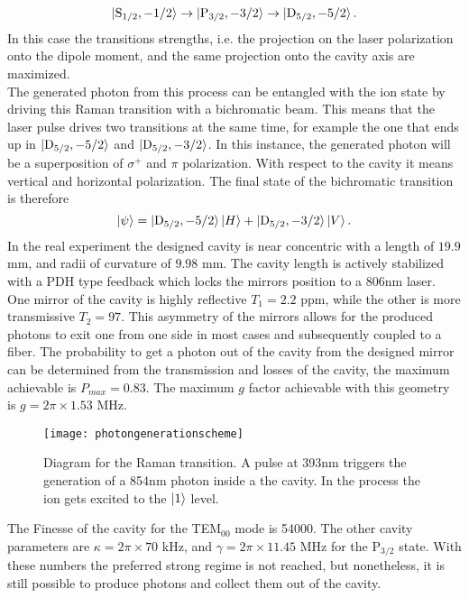 \begin{equation}
\ket{\text{S}_{1/2},-1/2}\to\ket{\text{P}_{3/2},-3/2} \to \ket{\text{D}_{5/2},-5/2}.
\end{equation}
In this case the transitions strengths, i.e. the projection on the laser polarization onto the dipole moment, and the same projection onto the cavity axis are maximized.\\
The generated photon from this process can be entangled with the ion state by driving this Raman transition with a bichromatic beam. This means that the laser pulse drives two transitions at the same time, for example the one that ends up in $\ket{\text{D}_{5/2},-5/2}$ and $\ket{\text{D}_{5/2},-3/2}$. In this instance, the generated photon will be a superposition of $\sigma^+$ and $\pi$ polarization. With respect to the cavity it means vertical and horizontal polarization. The final state of the bichromatic transition is therefore
\begin{equation}
\ket{\psi} = \ket{\text{D}_{5/2},-5/2}\ket{H} + \ket{\text{D}_{5/2},-3/2}\ket{V}.
\end{equation}
In the real experiment the designed cavity is near concentric with a length of $19.9$ mm, and radii of curvature of $9.98$ mm. The cavity length is actively stabilized with a PDH type feedback which locks the mirrors position to a 806nm laser. One mirror of the cavity is highly reflective $T_1 = 2.2$ ppm, while the other is more transmissive $T_2 = 97$. This asymmetry of the mirrors allows for the produced photons to exit one from one side in most cases and subsequently coupled to a fiber. The probability to get a photon out of the cavity from the designed mirror can be determined from the transmission and losses of the cavity, the maximum achievable is $P_{max} = 0.83$. The maximum $g$ factor achievable with this geometry is $g = 2\pi \times 1.53$ MHz.
\begin{figure}[H]
     \centering
     \texttt{[image: photongenerationscheme]}
    \caption{Diagram for the Raman transition. A pulse at 393nm triggers the generation of a 854nm photon inside a the cavity. In the process the ion gets excited to the $\ket{1}$ level.}
      \label{ramanprocess}
\end{figure}
 The Finesse of the cavity for the TEM$_{00}$ mode is 54000. The other cavity parameters are $\kappa = 2\pi \times 70$ kHz, and $\gamma = 2\pi\times 11.45$ MHz for the $\text{P}_{3/2}$ state. With these numbers the preferred strong regime is not reached, but nonetheless,  it is still possible to produce photons and collect them out of the cavity.

